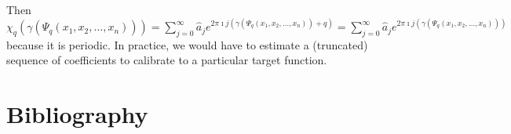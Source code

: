 Then $\chi_q\left(\gamma\left(\Psi_q\left(x_1, x_2, \dots, x_n\right)\right)\right) = \sum\limits_{j = 0}^\infty \widehat{a}_j e^{2\pi \imath j \left(\gamma\left(\Psi_q\left(x_1, x_2, \dots, x_n\right)\right) + q\right)} = \sum\limits_{j = 0}^\infty \widehat{a}_j e^{2\pi \imath j \left(\gamma\left(\Psi_q\left(x_1, x_2, \dots, x_n\right)\right)\right)}$ because it is periodic. In practice, we would have to estimate a (truncated) sequence of coefficients to calibrate to a particular target function.

\chapter*{Bibliography}



    \nocite{*}  %

